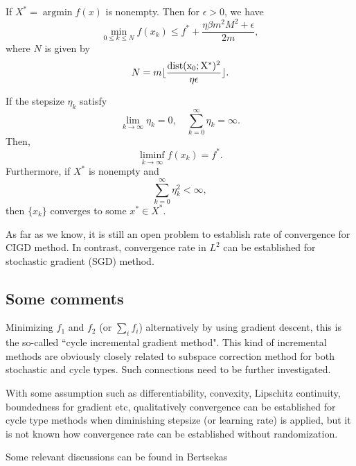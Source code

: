 \begin{theorem}
	If $X^* = \mathop{\arg\min}f(x)$ is nonempty. Then for $\epsilon > 0$, we have 
	\begin{equation}
	\min_{ 0\le k \le N} f(x_k) \le f^* + \frac{\eta \beta m^2 M^2 + \epsilon}{2m},
	\end{equation}
	where $N$ is given by
	\begin{equation}
	N = m \lfloor \frac{\rm{dist}(x_0;X^*)^2}{\eta \epsilon}\rfloor.
	\end{equation}
\end{theorem}

\begin{theorem}
	If the stepsize $\eta_k$ satisfy
	\begin{equation}
	\lim_{k \to \infty} \eta_k = 0, \quad \sum_{k=0}^{\infty} \eta_k = \infty.
	\end{equation}
	Then,
	\begin{equation}
	\mathop{\lim\inf}_{k\to \infty} f(x_k) = f^*.
	\end{equation}
	Furthermore, if $X^*$ is nonempty and 
	\begin{equation}
	\sum_{k=0}^\infty \eta_k^2 < \infty,
	\end{equation}
	then $\{x_k\}$ converges to some $x^* \in X^*$.
\end{theorem}

As far as we know, it is still an open problem to establish rate of
convergence for CIGD method.  In contrast, convergence rate in $L^2$
can be established for stochastic gradient (SGD) method.  
\subsection{Some comments}
Minimizing $f_1$ and $f_2$ (or $\sum_i f_i$) alternatively by using
gradient descent, this is the so-called ``cycle incremental gradient
method".   This kind of incremental methods are obviously closely
related to subspace correction method for both
stochastic and cycle types.  Such connections need to be further
investigated. 

With some assumption such as differentiability, convexity, Lipschitz
continuity, boundedness for gradient etc, qualitatively convergence
can be established for cycle type methods when diminishing stepsize
(or learning rate) is applied, but it is not known how convergence rate
can be established without randomization.

Some relevant discussions can be found in Bertsekas \cite{bertsekas2015convex, bertsekas2011incremental}
